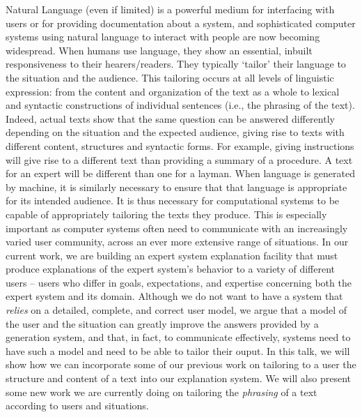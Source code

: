 \begin{thebibliography}{10}
{\leftskip=0.1in\rightskip=0.1in\begin{small}\par{}Natural Language (even if limited) is a powerful medium for interfacing with
  users or for providing documentation about a system, and sophisticated
  computer systems using natural language to interact with people are now
  becoming widespread. When humans use language, they show an essential,
  inbuilt responsiveness to their hearers/readers. They typically `tailor'
  their language to the situation and the audience. This tailoring occurs at
  all levels of linguistic expression: from the content and organization of the
  text as a whole to lexical and syntactic constructions of individual
  sentences (i.e., the phrasing of the text). Indeed, actual texts show that
  the same question can be answered differently depending on the situation and
  the expected audience, giving rise to texts with different content,
  structures and syntactic forms. For example, giving instructions will give
  rise to a different text than providing a summary of a procedure. A text for
  an expert will be different than one for a layman. When language is generated
  by machine, it is similarly necessary to ensure that that language is
  appropriate for its intended audience. It is thus necessary for computational
  systems to be capable of appropriately tailoring the texts they produce. This
  is especially important as computer systems often need to communicate with an
  increasingly varied user community, across an ever more extensive range of
  situations. In our current work, we are building an expert system explanation
  facility that must produce explanations of the expert system's behavior to a
  variety of different users -- users who differ in goals, expectations, and
  expertise concerning both the expert system and its domain. Although we do
  not want to have a system that {\em relies} on a detailed, complete, and
  correct user model, we argue that a model of the user and the situation can
  greatly improve the answers provided by a generation system, and that, in
  fact, to communicate effectively, systems need to have such a model and need
  to be able to tailor their ouput. In this talk, we will show how we can
  incorporate some of our previous work on tailoring to a user the structure
  and content of a text into our explanation system. We will also present some
  new work we are currently doing on tailoring the {\em phrasing} of a text
  according to users and situations.\end{small}\par}
\noindent\hspace*{\itemindent}{\leftskip=0.1in\rightskip=0.1in\hrulefill}


\end{thebibliography}
